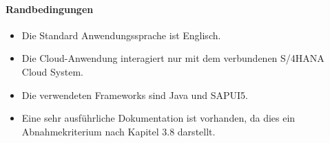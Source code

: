 \paragraph{Randbedingungen}
\begin{itemize}
    \item Die Standard Anwendungssprache ist Englisch.
    \item Die Cloud-Anwendung interagiert nur mit dem verbundenen S/4HANA Cloud System.
    \item Die verwendeten Frameworks sind Java und SAPUI5.
    \item Eine sehr ausführliche Dokumentation ist vorhanden, da dies ein Abnahmekriterium nach Kapitel 3.8 darstellt.
\end{itemize}